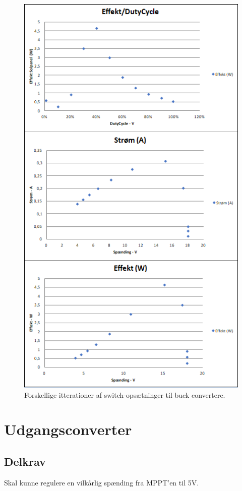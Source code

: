 \documentclass[../main.tex]{subfiles}
\begin{document}
            \begin{figure}[H]
            \includegraphics[scale = 0.8]{Dokumentation/Figures/PV_buckHardwareTest.png}
            \caption{Forskellige itterationer af switch-opsætninger til buck convertere.}
            \label{fig: Testresultater MPPT-Buckconverter}
            \end{figure}
                    
\section{Udgangsconverter}
        
    \subsection{Delkrav}
        Skal kunne regulere en vilkårlig spænding fra MPPT'en til 5V.
        
\end{document}

